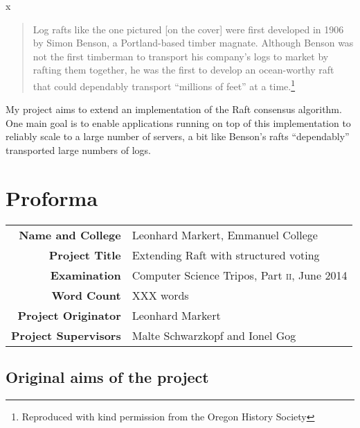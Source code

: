 \documentclass[12pt,chapterprefix=true,toc=bibliography,numbers=noendperiod,
               footnotes=multiple,twoside]{scrreprt}
\begin{document}

{}



{\color{white}x}

\vfil

\begin{quote}
Log rafts like the one pictured [on the cover] were first developed in 1906 by Simon Benson, a Portland-based timber magnate. Although Benson was not the first timberman to transport his company's logs to market by rafting them together, he was the first to develop an ocean-worthy raft that could dependably transport \enquote{millions of feet} at a time.\footnote{Reproduced with kind permission from the Oregon History Society}
\end{quote}

My project aims to extend an implementation of the Raft consensus algorithm. One main goal is to enable applications running on top of this implementation to reliably scale to a large number of servers, a bit like Benson's rafts \enquote{dependably} transported large numbers of logs.

\chapter*{Proforma}
\label{ch:proforma}

\begin{center}
{\renewcommand{\arraystretch}{1.5}%
\begin{tabularx}{330pt}{rX}
\textbf{Name and College} & Leonhard Markert, Emmanuel College \\
\textbf{Project Title} & Extending Raft with structured voting \\
\textbf{Examination} & Computer Science Tripos, Part \textsc{ii}, June 2014 \\
\textbf{Word Count} & XXX words \\
\textbf{Project Originator} & Leonhard Markert \\
\textbf{Project Supervisors} & Malte Schwarzkopf and Ionel Gog
\end{tabularx}}
\end{center}

\section*{Original aims of the project}
\label{sc:original-aims}
\end{document}
